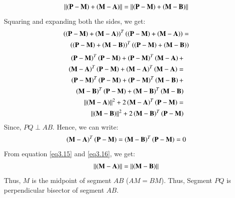 \documentclass[journal,12pt,twocolumn]{IEEEtran}
\begin{document}
\begin{align}
    \left\lVert\left(\mathbf{P}-\mathbf{M}\right)+\left(\mathbf{M}-\mathbf{A}\right)\right\rVert=\left\lVert\left(\mathbf{P}-\mathbf{M}\right)+\left(\mathbf{M}-\mathbf{B}\right)\right\rVert
\end{align}
Squaring and expanding both the sides, we get:
\begin{align}
\left(\left(\mathbf{P}-\mathbf{M}\right)+\left(\mathbf{M}-\mathbf{A}\right)\right)^T\left(\left(\mathbf{P}-\mathbf{M}\right)+\left(\mathbf{M}-\mathbf{A}\right)\right) = \nonumber \\
\left(\left(\mathbf{P}-\mathbf{M}\right)+\left(\mathbf{M}-\mathbf{B}\right)\right)^T\left(\left(\mathbf{P}-\mathbf{M}\right)+\left(\mathbf{M}-\mathbf{B}\right)\right)
\end{align}
\begin{align}
\left(\mathbf{P}-\mathbf{M}\right)^T\left(\mathbf{P}-\mathbf{M}\right)+\left(\mathbf{P}-\mathbf{M}\right)^T\left(\mathbf{M}-\mathbf{A}\right)+ \nonumber \\\left(\mathbf{M}-\mathbf{A}\right)^T\left(\mathbf{P}-\mathbf{M}\right)+\left(\mathbf{M}-\mathbf{A}\right)^T\left(\mathbf{M}-\mathbf{A}\right) = \nonumber \\
\left(\mathbf{P}-\mathbf{M}\right)^T\left(\mathbf{P}-\mathbf{M}\right)+\left(\mathbf{P}-\mathbf{M}\right)^T\left(\mathbf{M}-\mathbf{B}\right)+ \nonumber \\\left(\mathbf{M}-\mathbf{B}\right)^T\left(\mathbf{P}-\mathbf{M}\right)+\left(\mathbf{M}-\mathbf{B}\right)^T\left(\mathbf{M}-\mathbf{B}\right)\\
\left\lVert\left(\mathbf{M}-\mathbf{A}\right)\right\rVert^2+2\left(\mathbf{M}-\mathbf{A}\right)^T\left(\mathbf{P}-\mathbf{M}\right) = \nonumber \\
\left\lVert\left(\mathbf{M}-\mathbf{B}\right)\right\rVert^2+2\left(\mathbf{M}-\mathbf{B}\right)^T\left(\mathbf{P}-\mathbf{M}\right) \label{eq3.15}
\end{align}
Since, $PQ\perp AB$. Hence, we can write:
\begin{align}
\left(\mathbf{M}-\mathbf{A}\right)^T\left(\mathbf{P}-\mathbf{M}\right)=\left(\mathbf{M}-\mathbf{B}\right)^T\left(\mathbf{P}-\mathbf{M}\right)=0 \label{eq3.16}
\end{align}
From equation \ref{eq3.15} and \ref{eq3.16}, we get:
\begin{align}
    \left\lVert\left(\mathbf{M}-\mathbf{A}\right)\right\rVert=\left\lVert\left(\mathbf{M}-\mathbf{B}\right)\right\rVert
\end{align}
Thus, $M$ is the midpoint of segment $AB$ ($AM=BM$).
Thus, Segment $PQ$ is perpendicular bisector of segment $AB$.
\end{document}

